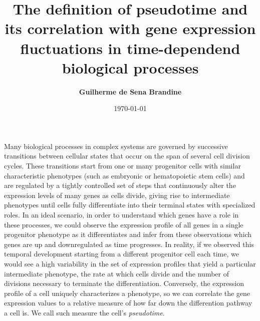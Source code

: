 \documentclass[11pt]{article}
\title{\bf The definition of pseudotime and its correlation with gene expression fluctuations in time-dependend biological processes}
\author{\bf Guilherme de Sena Brandine}
\date{\today}
\begin{document}
\maketitle
Many biological processes in complex systems are governed by successive transitions between cellular states that occur on the span of several cell division cycles. These transitions start from one or many progenitor cells with similar characteristic phenotypes (such as embryonic or hematopoietic stem cells) and are regulated by a tightly controlled set of steps that continuously alter the expression levels of many genes as cells divide, giving rise to intermediate phenotypes until cells fully differentiate into their terminal states with specialized roles. In an ideal scenario, in order to understand which genes have a role in these processes, we could observe the expression profile of all genes in a single progenitor phenotype as it differentiates and infer from these observations which genes are up and downregulated as time progresses. In reality, if we observed this temporal development starting from a different progenitor cell each time, we would see a high variability in the set of expression profiles that yield a particular intermediate phenotype, the rate at which cells divide and the number of divisions necessary to terminate the differentiation. Conversely, the expression profile of a cell uniquely characterizes a phenotype, so we can correlate the gene expression values to a relative measure of how far down the differention pathway a cell is. We call such measure the cell's \emph{pseudotime}. \\
\\
\end{document}
